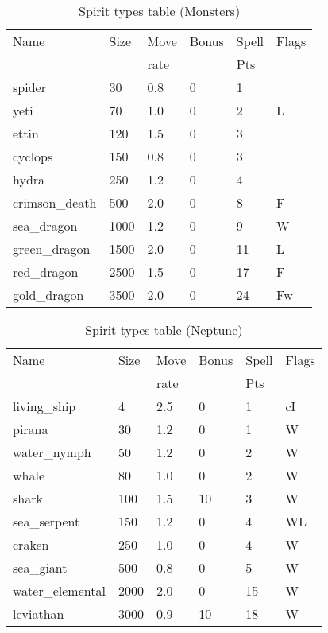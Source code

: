 \begin{same}
\begin{table}[hbpt]
\caption{Spirit types table (Monsters)}
\begin{center}
\begin{tabular}{ || l | l | l | l | l | l || }
\hline
Name            & Size & Move & Bonus &Spell&Flags\\
                &      & rate &       &Pts  &\\
\hline
spider          &   30 & 0.8 &   0 &  1 &\\
yeti            &   70 & 1.0 &   0 &  2 &L\\
ettin           &  120 & 1.5 &   0 &  3 &\\
cyclops         &  150 & 0.8 &   0 &  3 &\\
hydra           &  250 & 1.2 &   0 &  4 &\\
crimson_death   &  500 & 2.0 &   0 &  8 &F\\
sea_dragon      & 1000 & 1.2 &   0 &  9 &W\\
green_dragon    & 1500 & 2.0 &   0 & 11 &L\\
red_dragon      & 2500 & 1.5 &   0 & 17 &F\\
gold_dragon     & 3500 & 2.0 &   0 & 24 &Fw\\
\hline
\end{tabular}
\end{center}
\end{table}
\end{same}
\begin{same}
\begin{table}[hbpt]
\caption{Spirit types table (Neptune)}
\begin{center}
\begin{tabular}{ || l | l | l | l | l | l || }
\hline
Name            & Size & Move & Bonus &Spell&Flags\\
                &      & rate &       &Pts  &\\
\hline
living_ship     &    4 & 2.5 &   0 &  1 &cI\\
pirana          &   30 & 1.2 &   0 &  1 &W\\
water_nymph     &   50 & 1.2 &   0 &  2 &W\\
whale           &   80 & 1.0 &   0 &  2 &W\\
shark           &  100 & 1.5 &  10 &  3 &W\\
sea_serpent     &  150 & 1.2 &   0 &  4 &WL\\
craken          &  250 & 1.0 &   0 &  4 &W\\
sea_giant       &  500 & 0.8 &   0 &  5 &W\\
water_elemental & 2000 & 2.0 &   0 & 15 &W\\
leviathan       & 3000 & 0.9 &  10 & 18 &W\\
\hline
\end{tabular}
\end{center}
\end{table}
\end{same}
